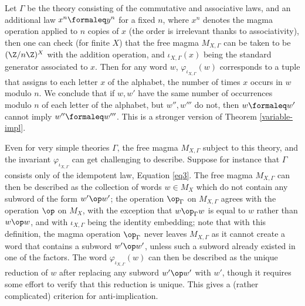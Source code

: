 \begin{example}
  Let $\Gamma$ be the theory consisting of the commutative and associative laws, and an additional law $x^n \formaleq y^n$ for a fixed $n$, where $x^n$ denotes the magma operation applied to $n$ copies of $x$ (the order is irrelevant thanks to associativity), then one can check (for finite $X$) that the free magma $M_{X,\Gamma}$ can be taken to be $(\Z/n\Z)^X$ with the addition operation, and $\iota_{X,\Gamma}(x)$ being the standard generator associated to $x$. Then for any word $w$, $\varphi_{\iota_{X,\Gamma}}(w)$ corresponds to a tuple that assigns to each letter $x$ of the alphabet, the number of times $x$ occurs in $w$ modulo $n$. We conclude that if $w,w'$ have the same number of occurrences modulo $n$ of each letter of the alphabet, but $w'', w'''$ do not, then $w \formaleq w'$ cannot imply $w'' \formaleq w'''$. This is a stronger version of Theorem \ref{variable-impl}.
\end{example}

Even for very simple theories $\Gamma$, the free magma $M_{X,\Gamma}$ subject to this theory, and the invariant $\varphi_{\iota_{X,\Gamma}}$ can get challenging to describe. Suppose for instance that $\Gamma$ consists only of the idempotent law, Equation \ref{eq3}. The free magma $M_{X,\Gamma}$ can then be described as the collection of words $w \in M_X$ which do not contain any subword of the form $w' \op w'$; the operation $\op_\Gamma$ on $M_{X,\Gamma}$ agrees with the operation $\op$ on $M_X$, with the exception that $w \op_\Gamma w$ is equal to $w$ rather than $w \op w$, and with $\iota_{X,\Gamma}$ being the identity embedding; note that with this definition, the magma operation $\op_\Gamma$ never leaves $M_{X,\Gamma}$ as it cannot create a word that contains a subword $w' \op w'$, unless such a subword already existed in one of the factors. The word $\varphi_{\iota_{X,\Gamma}}(w)$ can then be described as the unique reduction of $w$ after replacing any subword $w' \op w'$ with $w'$, though it requires some effort to verify that this reduction is unique. This gives a (rather complicated) criterion for anti-implication.
